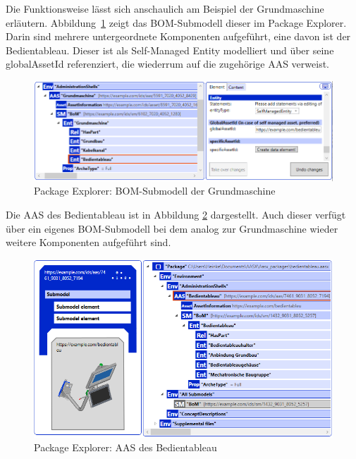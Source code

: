 Die Funktionsweise lässt sich anschaulich am Beispiel der Grundmaschine erläutern.
Abbildung~\ref{fig:BOMSubmodelGrundmashcine} zeigt das BOM-Submodell dieser im Package Explorer.
Darin sind mehrere untergeordnete Komponenten aufgeführt, eine davon ist der Bedientableau.
Dieser ist als Self-Managed Entity modelliert und über seine globalAssetId referenziert, die wiederrum auf die zugehörige AAS verweist.

\begin{figure}[htbp]
    \centering
        \includegraphics[width=1\textwidth]{Bilder/ErgebnissePackageExplorer/GundmaschneEntitie.PNG}
    \caption{Package Explorer: BOM-Submodell der Grundmaschine}
    \label{fig:BOMSubmodelGrundmashcine}
\end{figure}

Die AAS des Bedientableau ist in Abbildung \ref{fig:AASBedientableau} dargestellt.
Auch dieser verfügt über ein eigenes BOM-Submodell bei dem analog zur Grundmaschine wieder weitere Komponenten aufgeführt sind.

\begin{figure}[htbp]
    \centering
        \includegraphics[width=1\textwidth]{Bilder/ErgebnissePackageExplorer/Bedientableau+.PNG}
    \caption{Package Explorer: AAS des Bedientableau}
    \label{fig:AASBedientableau}
\end{figure}

